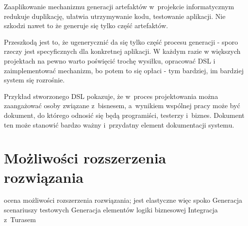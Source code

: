 Zaaplikowanie mechanizmu generacji artefaktów w~projekcie informatycznym redukuje duplikację, ułatwia utrzymywanie kodu, testowanie aplikacji.
Nie szkodzi nawet to że generuje się tylko część artefaktów.

Przeszkodą jest to, że ugenerycznić da się tylko część procesu generacji - sporo rzeczy jest specyficznych dla konkretnej aplikacji.
W każdym razie w większych projektach na pewno warto poświęcić trochę wysiłku, opracować DSL i zaimplementować mechanizm, bo potem to się opłaci - tym bardziej, im bardziej system się rozrośnie.

Przykład stworzonego DSL pokazuje, że w~proces projektowania można zaangażować osoby związane z~bisnesem, a~wynikiem wspólnej pracy może być dokument, do którego odnosić się będą programiści, testerzy i~biznes.
Dokument ten może stanowić bardzo ważny i~przydatny element dokumentacji systemu.



\section{Możliwości rozszerzenia rozwiązania}

ocena możliwości rozszerzenia rozwiązania; jest elastyczne więc spoko
Generacja scenariuszy testowych
Generacja elementów logiki biznesowej
Integracja z~Turasem
